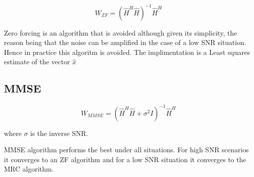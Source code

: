\begin{equation}
    W_{ZF} = (\hat{H}^H\hat{H})^{-1}\hat{H}^H
\end{equation}

Zero forcing is an algorithm that is avoided although given its simplicity, the reason being that the noise can be amplified in the case of a low SNR situation. Hence in practice this algoritm is avoided. The implimentation is a Least squares estimate of the vector $\hat{x}$

\subsection{MMSE}\label{ssec:MMSE}

\begin{equation}
    W_{MMSE} = (\hat{H}^H\hat{H}+\sigma^{2}I)^{-1}\hat{H}^H
\end{equation}

where $\sigma$ is the inverse SNR.

MMSE algorithm performs the best under all situations. For high SNR scenarios it converges to an ZF algorithm and for a low SNR situation it converges to the MRC algorithm.

%

